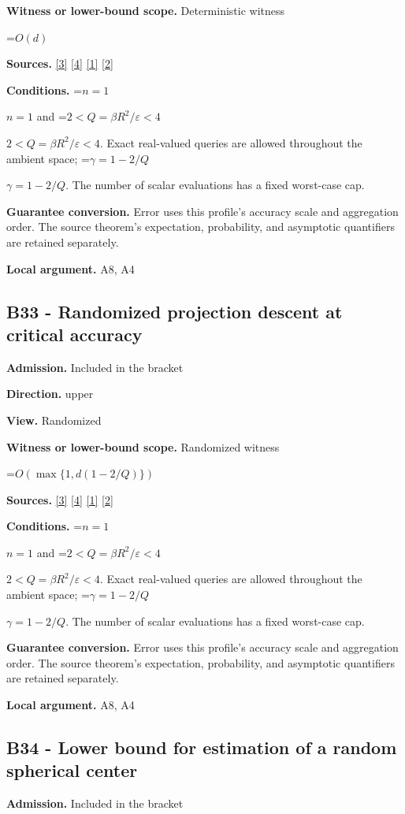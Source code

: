 \documentclass[10pt,a4paper]{article}
\newcommand{\AtlasMath}[1]{\par\begingroup\centering\setbox0=\hbox{$\displaystyle #1$}\ifdim\wd0>1.4\linewidth\typeout{ATLAS WIDE FORMULA: \the\wd0}\fi\ifdim\wd0>\linewidth\resizebox{\linewidth}{!}{\box0}\else\box0\fi\par\endgroup}
\newcommand{\AtlasInlineMath}[1]{\begingroup\setbox0=\hbox{$#1$}\ifdim\wd0>.4\linewidth\endgroup\AtlasMath{#1}\else\endgroup$#1$\fi}
\begin{document}
\textbf{Witness or lower-bound scope.} Deterministic witness

\AtlasMath{O(d)}
\textbf{Sources.} \href{https://arxiv.org/html/2607.16558v2}{[3]} \href{https://www.mathnet.ru/php/archive.phtml?jrnid=mzm&option_lang=eng&paperid=1697&wshow=paper}{[4]} \href{https://arxiv.org/html/2610.00345v1}{[1]} \href{https://arxiv.org/abs/2109.08858}{[2]}

\textbf{Conditions.} \AtlasInlineMath{n=1} and \AtlasInlineMath{2<Q=\beta R^2/\varepsilon<4}. Exact real-valued queries are allowed throughout the ambient space; \AtlasInlineMath{\gamma=1-2/Q}. The number of scalar evaluations has a fixed worst-case cap.

\textbf{Guarantee conversion.} Error uses this profile's accuracy scale and aggregation order. The source theorem's expectation, probability, and asymptotic quantifiers are retained separately.

\textbf{Local argument.} A8, A4

\subsection{B33 - Randomized projection descent at critical accuracy}
\textbf{Admission.} Included in the bracket

\textbf{Direction.} upper

\textbf{View.} Randomized

\textbf{Witness or lower-bound scope.} Randomized witness

\AtlasMath{O(\max\{1,d(1-2/Q)\})}
\textbf{Sources.} \href{https://arxiv.org/html/2607.16558v2}{[3]} \href{https://www.mathnet.ru/php/archive.phtml?jrnid=mzm&option_lang=eng&paperid=1697&wshow=paper}{[4]} \href{https://arxiv.org/html/2610.00345v1}{[1]} \href{https://arxiv.org/abs/2109.08858}{[2]}

\textbf{Conditions.} \AtlasInlineMath{n=1} and \AtlasInlineMath{2<Q=\beta R^2/\varepsilon<4}. Exact real-valued queries are allowed throughout the ambient space; \AtlasInlineMath{\gamma=1-2/Q}. The number of scalar evaluations has a fixed worst-case cap.

\textbf{Guarantee conversion.} Error uses this profile's accuracy scale and aggregation order. The source theorem's expectation, probability, and asymptotic quantifiers are retained separately.

\textbf{Local argument.} A8, A4

\subsection{B34 - Lower bound for estimation of a random spherical center}
\textbf{Admission.} Included in the bracket
\end{document}
